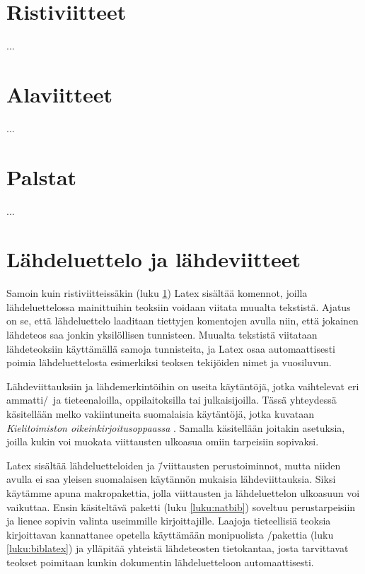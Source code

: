 
\section{Ristiviitteet}
\label{luku:ristiviitteet}

...

\section{Alaviitteet}
\label{luku:alaviitteet}

...



\section{Palstat}
\label{luku:palstat}


...

\section{Lähdeluettelo ja lähdeviitteet}
\label{luku:lähteet}

Samoin kuin ristiviitteissäkin (luku \ref{luku:ristiviitteet}) Latex
sisältää komennot, joilla lähdeluettelossa mainittuihin teoksiin voidaan
viitata muualta tekstistä. Ajatus on se, että lähdeluettelo laaditaan
tiettyjen komentojen avulla niin, että jokainen lähdeteos saa jonkin
yksilöllisen tunnisteen. Muualta tekstistä viitataan lähdeteoksiin
käyttämällä samoja tunnisteita, ja Latex osaa automaattisesti poimia
lähdeluettelosta esimerkiksi teoksen tekijöiden nimet ja vuosiluvun.

Lähdeviittauksiin ja lähdemerkintöihin on useita käytäntöjä, jotka
vaihtelevat eri ammatti\-/\ ja tieteenaloilla, oppilaitoksilla tai
julkaisijoilla. Tässä yhteydessä käsitellään melko vakiintuneita
suomalaisia käytäntöjä, jotka kuvataan \emph{Kielitoimiston
  oikeinkirjoitusoppaassa} \parencite{kt_oik}. Samalla käsitellään
joitakin asetuksia, joilla kukin voi muokata viittausten ulkoasua omiin
tarpeisiin sopivaksi.

Latex sisältää lähdeluetteloiden ja \=/viittausten perustoiminnot, mutta
niiden avulla ei saa yleisen suomalaisen käytännön mukaisia
lähdeviittauksia. Siksi käytämme apuna makropakettia, jolla viittausten
ja lähdeluettelon ulkoasuun voi vaikuttaa. Ensin käsiteltävä paketti
 (luku \ref{luku:natbib}) soveltuu perustarpeisiin ja
lienee sopivin valinta useimmille kirjoittajille. Laajoja tieteellisiä
teoksia kirjoittavan kannattanee opetella käyttämään monipuolista
\-/pakettia (luku \ref{luku:biblatex}) ja ylläpitää
yhteistä lähdeteosten tietokantaa, josta tarvittavat teokset poimitaan
kunkin dokumentin lähdeluetteloon automaattisesti.

